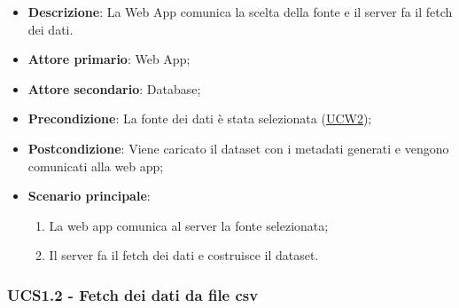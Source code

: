\begin{itemize}

	\item \textbf{Descrizione}: La Web App comunica la scelta della fonte e il server fa il fetch dei dati.

	\item \textbf{Attore primario}: Web App;
	\item \textbf{Attore secondario}: Database;

	\item \textbf{Precondizione}:   La fonte dei dati è stata selezionata (\hyperref[ssub:ucw2]{UCW2});

	\item \textbf{Postcondizione}:  Viene caricato il dataset con i metadati generati e vengono comunicati alla web app;

	\item \textbf{Scenario principale}:
	      \begin{enumerate}
		      \item La web app comunica al server la fonte selezionata;
		      \item Il server fa il fetch dei dati e costruisce il dataset.
	      \end{enumerate}

\end{itemize}


\subsubsection{UCS1.2 - Fetch dei dati da file csv}
\label{ssub:ucs1.2}

